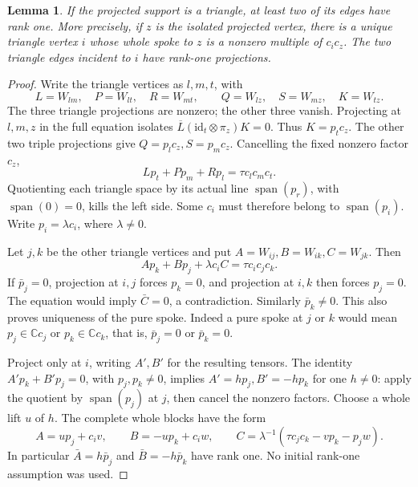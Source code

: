 \documentclass[11pt,letterpaper]{article}
\newcommand{\C}{\mathbb C}
\newcommand{\Span}{\operatorname{span}}
\newtheorem{lemma}[theorem]{Lemma}
\theoremstyle{definition}
\begin{document}
\begin{lemma}\label{support:triangle}
If the projected support is a triangle, at least two of its edges have
rank one. More precisely, if \(z\) is the isolated projected vertex, there
is a unique triangle vertex \(i\) whose whole spoke to \(z\) is a nonzero
multiple of \(c_ic_z\). The two triangle edges incident to \(i\) have
rank-one projections.
\end{lemma}
\begin{proof}
Write the triangle vertices as \(l,m,t\), with
\[
 L=W_{lm},\quad P=W_{lt},\quad R=W_{mt},\qquad
 Q=W_{lz},\quad S=W_{mz},\quad K=W_{tz}.
\]
The three triangle projections are nonzero; the other three vanish.
Projecting at \(l,m,z\) in the full equation isolates
\(\overline L(\mathrm{id}_t\otimes\pi_z)K=0\). Thus
\(K=p_t c_z\). The other two triple projections give
\(Q=p_l c_z,S=p_m c_z\). Cancelling the fixed nonzero factor \(c_z\),
\[
 Lp_t+Pp_m+Rp_l=\tau c_lc_mc_t.
\]
Quotienting each triangle space by its actual line \(\Span(p_r)\), with
\(\Span(0)=0\), kills the left side. Some \(c_i\) must therefore belong
to \(\Span(p_i)\). Write \(p_i=\lambda c_i\), where \(\lambda\ne0\).

Let \(j,k\) be the other triangle vertices and put
\(A=W_{ij},B=W_{ik},C=W_{jk}\). Then
\[
 Ap_k+Bp_j+\lambda c_iC=\tau c_ic_jc_k.
\]
If \(\bar p_j=0\), projection at \(i,j\) forces \(p_k=0\), and projection at
\(i,k\) then forces \(p_j=0\). The equation would imply \(\bar C=0\),
a contradiction. Similarly \(\bar p_k\ne0\). This also proves uniqueness
of the pure spoke.
Indeed a pure spoke at \(j\) or \(k\) would mean \(p_j\in\C c_j\) or
\(p_k\in\C c_k\), that is, \(\bar p_j=0\) or \(\bar p_k=0\).

Project only at \(i\), writing \(A',B'\) for the resulting tensors.
The identity \(A'p_k+B'p_j=0\), with \(p_j,p_k\ne0\), implies
\(A'=hp_j,B'=-hp_k\) for one \(h\ne0\): apply the quotient by \(\Span(p_j)\)
at \(j\), then cancel the nonzero factors. Choose a whole lift \(u\) of \(h\).
The complete whole blocks have the form
\begin{equation}\label{support:triangle-form}
 A=up_j+c_iv,\qquad B=-up_k+c_iw,\qquad
 C=\lambda^{-1}(\tau c_jc_k-vp_k-p_jw).
\end{equation}
In particular \(\bar A=h\bar p_j\) and \(\bar B=-h\bar p_k\) have rank one.
No initial rank-one assumption was used.
\end{proof}
\end{document}
